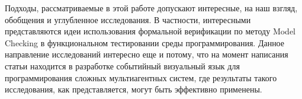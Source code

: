 \documentclass[conference]{IEEEtran}
\begin{document}
Подходы, рассматриваемые в этой работе допускают интересные, на наш взгляд, обобщения и углубленное исследования.
В частности, интересными представляются идеи использования формальной верификации по методу Model Checking в 
функциональном тестировании среды программирования. Данное направление исследований интересно еще и потому, что на момент 
написания статьи находится в разработке событийный визуальный язык для программирования сложных мультиагентных 
систем, где результаты такого исследования, как представляется, могут быть эффективно применены.



\end{document}
